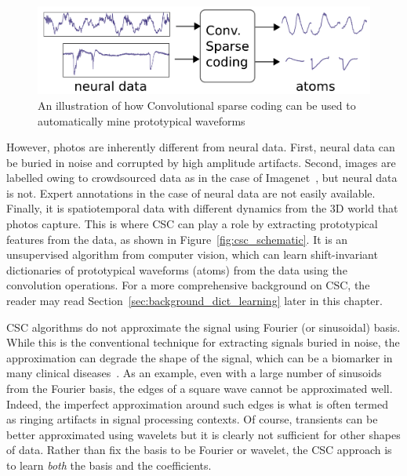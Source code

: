 \begin{figure}[htb]
\begin{center}
   \includegraphics[width=0.85\linewidth]{figures/schema.pdf}
\end{center}
   \caption[]{An illustration of how Convolutional sparse coding can be used to automatically mine prototypical waveforms}
   \label{fig:sommaire:csc_schematic}
\end{figure}

However, photos are inherently different from neural data. First, neural data can be buried in noise and corrupted by high amplitude artifacts. Second, images are labelled owing to crowdsourced data as in the case of  Imagenet~\citep{deng2009imagenet}, but neural data is not. 
Expert annotations in the case of neural data are not easily available.
Finally, it is spatiotemporal data with different dynamics from the 3D world that photos capture. This is where \ac{CSC} can play a role by extracting prototypical features from the data, as shown in Figure~\ref{fig:csc_schematic}. It is an unsupervised algorithm from computer vision, which can learn shift-invariant dictionaries of prototypical waveforms (atoms) from the data using the convolution operations. For a more comprehensive background on \ac{CSC}, the reader may read Section~\ref{sec:background_dict_learning} later in this chapter.

\ac{CSC} algorithms do not approximate the signal using Fourier (or sinusoidal) basis. While this is the conventional technique for extracting signals buried in noise, the approximation can degrade the shape of the signal, which can be a biomarker in many clinical diseases~\citep{cole2017brain}. As an example, even with a large number of sinusoids from the Fourier basis, the edges of a square wave cannot be approximated well. Indeed, the imperfect approximation around such edges is what is often termed as ringing artifacts in signal processing contexts. Of course, transients can be better approximated using wavelets but it is clearly not sufficient for other shapes of data. Rather than fix the basis to be Fourier or wavelet, the \ac{CSC} approach is to learn \emph{both} the basis and the coefficients.

